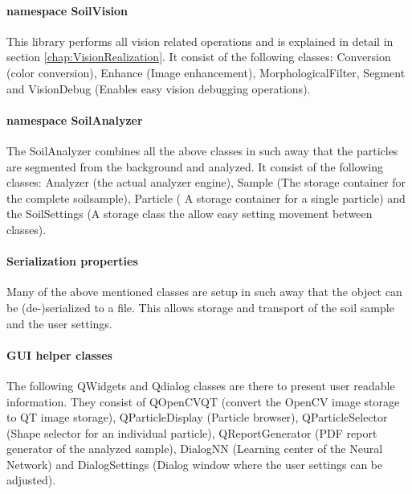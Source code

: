 \documentclass[11pt,fleqn,,a4paper,twoside,openright]{book}
\begin{document}
\paragraph{namespace SoilVision}
This library performs all vision related operations and is explained in detail in section \ref{chap:VisionRealization}. It consist of the following classes: Conversion (color conversion), Enhance (Image enhancement), MorphologicalFilter, Segment and VisionDebug (Enables easy vision debugging operations). 

\paragraph{namespace SoilAnalyzer}
The SoilAnalyzer combines all the above classes in such away that the particles are segmented from the background and analyzed. It consist of the following classes: Analyzer (the actual analyzer engine), Sample (The storage container for the complete soilsample), Particle ( A storage container for a single particle) and the SoilSettings (A storage class the allow easy setting movement between classes).

\paragraph{Serialization properties}
Many of the above mentioned classes are setup in such away that the object can be (de-)serialized to a file. This allows storage and transport of the soil sample and the user settings.

\paragraph{GUI helper classes}
The following QWidgets and Qdialog classes are there to present user readable information. They consist of QOpenCVQT (convert the OpenCV image storage to QT image storage), QParticleDisplay (Particle browser), QParticleSelector (Shape selector for an individual particle), QReportGenerator (PDF report generator of the analyzed sample), DialogNN (Learning center of the Neural Network) and DialogSettings (Dialog window where the user settings can be adjusted).
\end{document}

